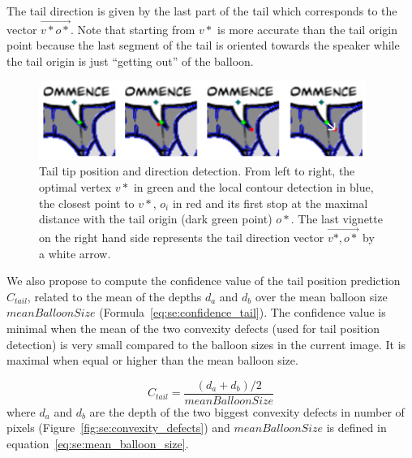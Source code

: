 
The tail direction is given by the last part of the tail which corresponds to the vector $\overrightarrow{v*o*}$.
Note that starting from $v*$ is more accurate than the tail origin point because the last segment of the tail is oriented towards the speaker while the tail origin is just ``getting out'' of the balloon.


    \begin{figure}[ht]%
      \centering
      \includegraphics[width=0.95\textwidth]{tail_refinement.png}
    \caption[Tail tip position and direction detection]{Tail tip position and direction detection. From left to right, the optimal vertex $v*$ in green and the local contour detection in blue, the closest point to $v*$, $o_i$ in red and its first stop at the maximal distance with the tail origin (dark green point) $o*$. The last vignette on the right hand side represents the tail direction vector $\overrightarrow{v*,o*}$ by a white arrow.}
    \label{fig:se:tail_tip_refinement}
    \end{figure}

We also propose to compute the confidence value of the tail position prediction $C_{tail}$, related to the mean of the depths $d_a$ and $d_b$ over the mean balloon size $meanBalloonSize$ (Formula~\ref{eq:se:confidence_tail}).
The confidence value is minimal when the mean of the two convexity defects (used for tail position detection) is very small compared to the balloon sizes in the current image.
It is maximal when equal or higher than the mean balloon size.

\begin{equation}
\label{eq:se:confidence_tail}
  C_{tail} = \frac{(d_a+d_b)/2}{meanBalloonSize}
\end{equation}
where $d_a$ and $d_b$ are the depth of the two biggest convexity defects in number of pixels (Figure~\ref{fig:se:convexity_defects}) and $meanBalloonSize$ is defined in equation~\ref{eq:se:mean_balloon_size}.

